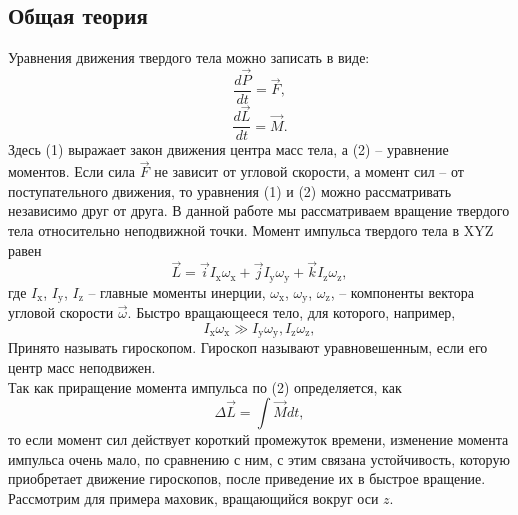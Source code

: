 \documentclass[a4paper, 12pt]{article}%
\begin{document}
\subsection{Общая теория}
Уравнения движения твердого тела можно записать в виде:
\begin{equation}
\dfrac{d\vec{P}}{dt}=\vec{F},
\end{equation}
\begin{equation}
\dfrac{d\vec{L}}{dt}=\vec{M}.
\end{equation}
Здесь (1) выражает закон движения центра масс тела, а (2) -- уравнение моментов. Если сила $\vec{F}$ не зависит от угловой скорости, а момент сил -- от поступательного движения, то уравнения (1) и (2) можно рассматривать независимо друг от друга. В данной работе  мы рассматриваем вращение твердого тела относительно неподвижной точки. Момент импульса твердого тела в XYZ равен 
\begin{equation}
\vec{L}=\vec{i}I_{\text{x}}\omega_{\text{x}}+\vec{j}I_{\text{y}}\omega_{\text{y}}+\vec{k}I_{\text{z}}\omega_{\text{z}},
\end{equation}
где $I_{\text{x}}$, $I_{\text{y}}$, $I_{\text{z}}$ -- главные моменты инерции, $\omega_{\text{x}}$, $\omega_{\text{y}}$, $\omega_{\text{z}}$, -- компоненты вектора угловой скорости $\vec{\omega}$. Быстро вращающееся тело, для которого, например,
\[I_{\text{x}}\omega_{\text{x}}\gg I_{\text{y}}\omega_{\text{y}}, I_{\text{z}}\omega_{\text{z}},\]
Принято называть гироскопом. Гироскоп называют уравновешенным, если его центр масс неподвижен. \\
Так как приращение момента импульса по (2) определяется, как
\begin{equation}
\Delta\vec{L}=\int\vec{M}dt,
\end{equation}
то если момент сил действует короткий промежуток времени, изменение момента импульса очень мало, по сравнению с ним, с этим связана устойчивость, которую приобретает движение гироскопов, после приведение их в быстрое вращение. \\
Рассмотрим для примера маховик, вращающийся вокруг оси $z$.
\\
\\
\\ \\ \\ \\ \\ \\ \\ \\ \\ \\ \\ \\ \\
\end{document}
